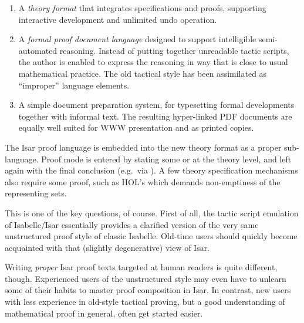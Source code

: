 \begin{isabellebody}
\begin{isamarkuptext}
  \begin{enumerate}
  
  \item A \emph{theory format} that integrates specifications and
  proofs, supporting interactive development and unlimited undo
  operation.
  
  \item A \emph{formal proof document language} designed to support
  intelligible semi-automated reasoning.  Instead of putting together
  unreadable tactic scripts, the author is enabled to express the
  reasoning in way that is close to usual mathematical practice.  The
  old tactical style has been assimilated as ``improper'' language
  elements.
  
  \item A simple document preparation system, for typesetting formal
  developments together with informal text.  The resulting
  hyper-linked PDF documents are equally well suited for WWW
  presentation and as printed copies.

  \end{enumerate}

  The Isar proof language is embedded into the new theory format as a
  proper sub-language.  Proof mode is entered by stating some
  \hyperlink{command.theorem}{\mbox{}} or \hyperlink{command.lemma}{\mbox{}} at the theory level, and
  left again with the final conclusion (e.g.\ via \hyperlink{command.qed}{\mbox{}}).
  A few theory specification mechanisms also require some proof, such
  as HOL's \hyperlink{command.typedef}{\mbox{}} which demands non-emptiness of the
  representing sets.%
\end{isamarkuptext}%
\isamarkuptrue%
%
\isamarkuptrue%
%
\begin{isamarkuptext}%
This is one of the key questions, of course.  First of all, the
  tactic script emulation of Isabelle/Isar essentially provides a
  clarified version of the very same unstructured proof style of
  classic Isabelle.  Old-time users should quickly become acquainted
  with that (slightly degenerative) view of Isar.

  Writing \emph{proper} Isar proof texts targeted at human readers is
  quite different, though.  Experienced users of the unstructured
  style may even have to unlearn some of their habits to master proof
  composition in Isar.  In contrast, new users with less experience in
  old-style tactical proving, but a good understanding of mathematical
  proof in general, often get started easier.


\end{isamarkuptext}
\end{isabellebody}
